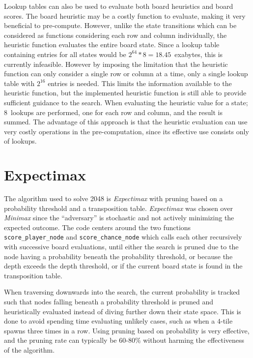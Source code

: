 Lookup tables can also be used to evaluate both board heuristics and board scores. The board heuristic may be a costly function to evaluate, making it very beneficial to pre-compute. However, unlike the state transitions which can be considered as functions considering each row and column individually, the heuristic function evaluates the entire board state. Since a lookup table containing entries for all states would be $2^{64}*8=18.45$~exabytes, this is currently infeasible. However by imposing the limitation that the heuristic function can only consider a single row or column at a time, only a single lookup table with $2^{16}$ entries is needed. This limits the information available to the heuristic function, but the implemented heuristic function is still able to provide sufficient guidance to the search. When evaluating the heuristic value for a state; 8~lookups are performed, one for each row and column, and the result is summed. The advantage of this approach is that the heuristic evaluation can use very costly operations in the pre-computation, since its effective use consists only of lookups.

\section*{Expectimax}

The algorithm used to solve \textsc{2048} is \textit{Expectimax} with pruning based on a probability threshold and a transposition table. \textit{Expectimax} was chosen over \textit{Minimax} since the ``adversary'' is stochastic and not actively minimizing the expected outcome. The code centers around the two functions \texttt{score\_player\_node} and \texttt{score\_chance\_node} which calls each other recursively with successive board evaluations, until either the search is pruned due to the node having a probability beneath the probability threshold, or because the depth exceeds the depth threshold, or if the current board state is found in the transposition table.

When traversing downwards into the search, the current probability is tracked such that nodes falling beneath a probability threshold is pruned and heuristically evaluated instead of diving further down their state space. This is done to avoid spending time evaluating unlikely cases, such as when a $4$-tile spawns three times in a row. Using pruning based on probability is very effective, and the pruning rate can typically be 60-80\% without harming the effectiveness of the algorithm.

